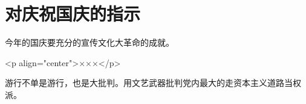 \section[对庆祝国庆的指示（一九六七年九月）]{对庆祝国庆的指示}


今年的国庆要充分的宣传文化大革命的成就。

<p align="center">×××</p>

游行不单是游行，也是大批判。用文艺武器批判党内最大的走资本主义道路当权派。

